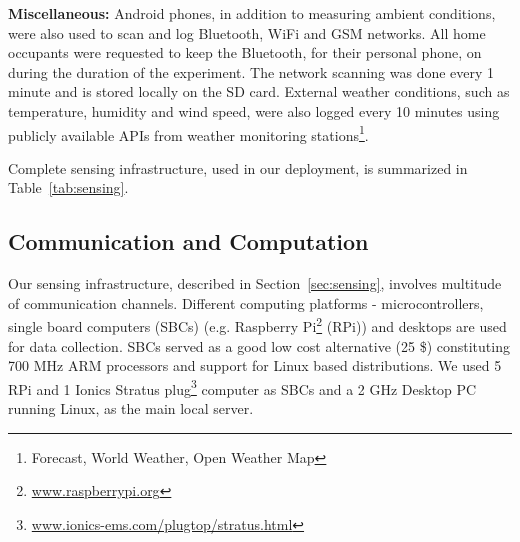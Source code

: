 \documentclass[10pt]{sensys-proc}
\newcommand{\secref}[1]{Section~\ref{#1}}
\newcommand{\tabref}[1]{Table~\ref{#1}}
\begin{document}
\noindent \textbf{Miscellaneous:} Android phones, in addition to measuring ambient conditions, were also used to scan and log Bluetooth, WiFi and GSM networks. All home occupants were requested to keep the Bluetooth, for their personal phone, on during the duration of the experiment. The network scanning was done every 1 minute and is stored locally on the SD card. External weather conditions, such as temperature, humidity and wind speed, were also logged every 10 minutes using publicly available APIs from weather monitoring stations\footnote{Forecast, World Weather, Open Weather Map}.


Complete sensing infrastructure, used in our deployment, is summarized in \tabref{tab:sensing}.

\subsection{Communication and Computation}
Our sensing infrastructure, described in \secref{sec:sensing}, involves multitude of communication channels. Different computing platforms - microcontrollers, single board computers (SBCs) (e.g. Raspberry Pi\footnote{\url{www.raspberrypi.org}} (RPi)) and desktops are used for data collection.  
SBCs served as a good low cost alternative (25 \$) constituting 700 MHz ARM processors and support for Linux based distributions. %
We used 5 RPi and 1 Ionics Stratus plug\footnote{\url{www.ionics-ems.com/plugtop/stratus.html}} computer as SBCs and a 2 GHz Desktop PC running Linux, as the main local server.
\end{document}
